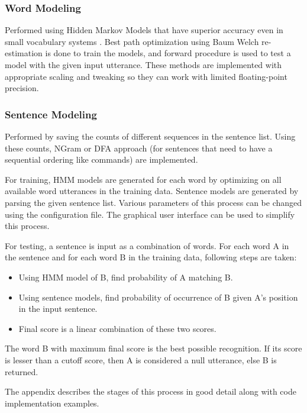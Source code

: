 \subsubsection{Word Modeling}
Performed using Hidden Markov Models that have superior accuracy \cite{Mustafa2017} even in small vocabulary systems \cite{10.1007/978-981-10-3920-1_46}. Best path optimization using Baum Welch re-estimation is done to train the models, and forward procedure is used to test a model with the given input utterance. These methods are implemented with appropriate scaling and tweaking so they can work with limited floating-point precision.

\subsubsection{Sentence Modeling}
Performed by saving the counts of different sequences in the sentence list. Using these counts, NGram or DFA approach (for sentences that need to have a sequential ordering like commands) are implemented.

For training, HMM models are generated for each word by optimizing on all available word utterances in the training data. Sentence models are generated by parsing the given sentence list. Various parameters of this process can be changed using the configuration file. The graphical user interface can be used to simplify this process.

For testing, a sentence is input as a combination of words. For each word A in the sentence and for each word B in the training data, following steps are taken:

\begin{itemize}
\item Using HMM model of B, find probability of A matching B.
\item Using sentence models, find probability of occurrence of B given A’s position in the input sentence.
\item Final score is a linear combination of these two scores.
\end{itemize}

The word B with maximum final score is the best possible recognition. If its score is lesser than a cutoﬀ score, then A is considered a null utterance, else B is returned.

The appendix describes the stages of this process in good detail along with code implementation examples.

\newpage

